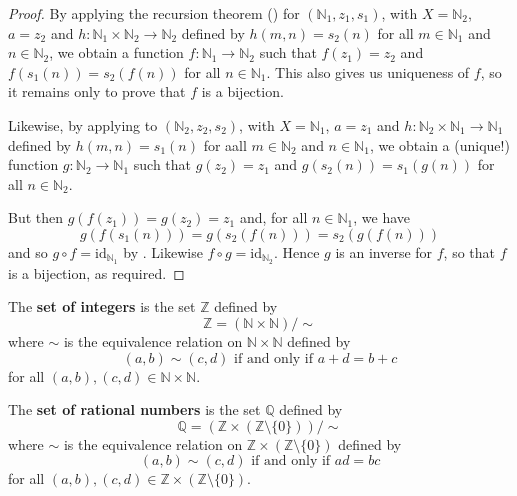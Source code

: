 \begin{proof}
By applying the recursion theorem () for $(\mathbb{N}_1, z_1, s_1)$, with $X = \mathbb{N}_2$, $a = z_2$ and $h : \mathbb{N}_1 \times \mathbb{N}_2 \to \mathbb{N}_2$ defined by $h(m,n) = s_2(n)$ for all $m \in \mathbb{N}_1$ and $n \in \mathbb{N}_2$, we obtain a function $f : \mathbb{N}_1 \to \mathbb{N}_2$ such that $f(z_1) = z_2$ and $f(s_1(n)) = s_2(f(n))$ for all $n \in \mathbb{N}_1$. This also gives us uniqueness of $f$, so it remains only to prove that $f$ is a bijection.

Likewise, by applying  to $(\mathbb{N}_2, z_2, s_2)$, with $X = \mathbb{N}_1$, $a = z_1$ and $h : \mathbb{N}_2 \times \mathbb{N}_1 \to \mathbb{N}_1$ defined by $h(m,n) = s_1(n)$ for aall $m \in \mathbb{N}_2$ and $n \in \mathbb{N}_1$, we obtain a (unique!) function $g : \mathbb{N}_2 \to \mathbb{N}_1$ such that $g(z_2) = z_1$ and $g(s_2(n)) = s_1(g(n))$ for all $n \in \mathbb{N}_2$.

But then $g(f(z_1)) = g(z_2) = z_1$ and, for all $n \in \mathbb{N}_1$, we have
\[ g(f(s_1(n))) = g(s_2(f(n))) = s_2(g(f(n))) \]
and so $g \circ f = \mathrm{id}_{\mathbb{N}_1}$ by . Likewise $f \circ g = \mathrm{id}_{\mathbb{N}_2}$. Hence $g$ is an inverse for $f$, so that $f$ is a bijection, as required.
\end{proof}

\todo{}



\begin{definition}
\label{defIntegersFromNaturalNumbers}
The \textbf{set of integers} is the set $\mathbb{Z}$ defined by
\[ \mathbb{Z} = (\mathbb{N} \times \mathbb{N})/{\sim} \]
where $\sim$ is the equivalence relation on $\mathbb{N} \times \mathbb{N}$ defined by
\[ (a,b) \sim (c,d) \text{ if and only if } a+d=b+c \]
for all $(a,b),(c,d) \in \mathbb{N} \times \mathbb{N}$.
\end{definition}



\begin{definition}
\label{defRationalsFromIntegers}
The \textbf{set of rational numbers} is the set $\mathbb{Q}$ defined by
\[ \mathbb{Q} = (\mathbb{Z} \times (\mathbb{Z} \setminus \{ 0 \})) / {\sim} \]
where $\sim$ is the equivalence relation on $\mathbb{Z} \times (\mathbb{Z} \setminus \{0\})$ defined by
\[ (a,b) \sim (c,d) \text{ if and only if } ad=bc \]
for all $(a,b),(c,d) \in \mathbb{Z} \times (\mathbb{Z} \setminus \{ 0 \})$.
\end{definition}

